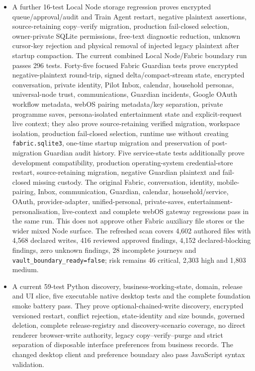 \documentclass[11pt]{article}
\newcommand{\code}[1]{\texttt{#1}}
\begin{document}
\begin{itemize}
  \item A further 16-test Local Node storage regression proves encrypted queue/approval/audit and Train Agent restart, negative plaintext assertions, source-retaining copy--verify migration, production fail-closed selection, owner-private SQLite permissions, free-text diagnostic reduction, unknown cursor-key rejection and physical removal of injected legacy plaintext after startup compaction. The current combined Local Node/Fabric boundary run passes 296 tests. Forty-five focused Fabric Guardian tests prove encrypted negative-plaintext round-trip, signed delta/compact-stream state, encrypted conversation, private identity, Pilot Inbox, calendar, household personas, universal-node trust, communications, Guardian incidents, Google OAuth workflow metadata, webOS pairing metadata/key separation, private programme saves, persona-isolated entertainment state and explicit-request live context; they also prove source-retaining verified migration, workspace isolation, production fail-closed selection, runtime use without creating \code{fabric.sqlite3}, one-time startup migration and preservation of post-migration Guardian audit history. Five service-state tests additionally prove development compatibility, production operating-system credential-store restart, source-retaining migration, negative Guardian plaintext and fail-closed missing custody. The original Fabric, conversation, identity, mobile-pairing, Inbox, communication, Guardian, calendar, household/service, OAuth, provider-adapter, unified-personal, private-saves, entertainment-personalisation, live-context and complete webOS gateway regressions pass in the same run. This does not approve other Fabric auxiliary file stores or the wider mixed Node surface. The refreshed scan covers 4,602 authored files with 4,568 declared writes, 416 reviewed approved findings, 4,152 declared-blocking findings, zero unknown findings, 28 incomplete journeys and \code{vault\_boundary\_ready=false}; risk remains 46 critical, 2,303 high and 1,803 medium.
  \item A current 59-test Python discovery, business-working-state, domain, release and UI slice, five executable native desktop tests and the complete foundation smoke battery pass. They prove optional-chained-write discovery, encrypted versioned restart, conflict rejection, state-identity and size bounds, governed deletion, complete release-registry and discovery-scenario coverage, no direct renderer browser-write authority, legacy copy--verify--purge and strict separation of disposable interface preferences from business records. The changed desktop client and preference boundary also pass JavaScript syntax validation.

\end{itemize}
\end{document}
